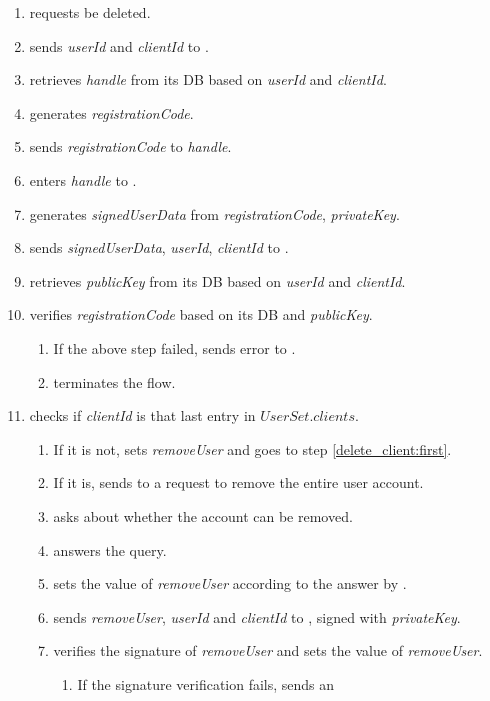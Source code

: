 \documentclass[a4paper,10pt,draft]{article}
\newcommand{\signedUserData}{\emph{signedUserData}}
\newcommand{\handle}{\emph{handle}}
\newcommand{\registrationCode}{\emph{registrationCode}}
\newcommand{\privateKey}{\emph{privateKey}}
\newcommand{\publicKey}{\emph{publicKey}}
\newcommand{\userId}{\emph{userId}}
\newcommand{\clientId}{\emph{clientId}}
\newcommand{\removeUser}{\emph{removeUser}}
\begin{document}
\begin{enumerate}
 \item \User{} requests \Client{} be deleted.
 \item \Client{} sends \userId{} and \clientId{} to \Server{}.
 \item \Server{} retrieves \handle{} from its DB based on \userId{} and 
\clientId{}.
 \item \Server{} generates \registrationCode{}.
 \item \Server{} sends \registrationCode{} to \handle{}.
 \item \User{} enters \handle{} to \Client{}.
 \item \Client{} generates \signedUserData{} from \registrationCode{}, 
\privateKey{}.
 \item \Client{} sends \signedUserData{}, \userId{}, \clientId{} to \Server{}.
 \item \Server{} retrieves \publicKey{} from its DB based on \userId{} and 
\clientId{}.
 \item \Server{} verifies \registrationCode{} based on its DB and \publicKey{}.
 \begin{enumerate}
  \item If the above step failed, \Server{} sends error to \Client{}.
  \item \Client{} terminates the flow.
 \end{enumerate}
 \item \Server{} checks if \clientId{} is that last entry in $UserSet.clients$.
 \begin{enumerate}
  \item If it is not, \Server{} sets \removeUser{} and goes to 
step \ref{delete_client:first}.
  \item If it is, \Server{} sends to \Client{} a request to remove the entire 
user account.
  \item \Client{} asks \User{} about whether the account can be removed.
  \item \User{} answers the query.
  \item \Client{} sets the value of \removeUser{} according to the answer by 
\User{}.
  \item{} \Client{} sends \removeUser{}, \userId{} and \clientId{} to 
\Server{}, signed with \privateKey{}.
  \item{} \Server{} verifies the signature of \removeUser{} and sets the value 
of \removeUser{}.
  \begin{enumerate}
   \item If the signature verification fails, \Server{} sends \Client{} an 

\end{enumerate}
\end{enumerate}
\end{enumerate}
\end{document}
